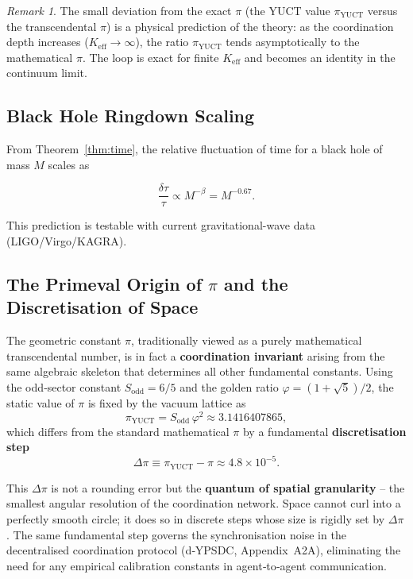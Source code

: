 \documentclass[12pt,a4paper]{article}
\theoremstyle{remark}
\newtheorem{remark}[theorem]{Remark}
\begin{document}
	\begin{remark}
		The small deviation from the exact \(\pi\) (the YUCT value
		\(\pi_{\mathrm{YUCT}}\) versus the transcendental \(\pi\)) is a physical
		prediction of the theory: as the coordination depth increases
		(\(K_{\mathrm{eff}} \to \infty\)), the ratio \(\pi_{\mathrm{YUCT}}\) tends
		asymptotically to the mathematical \(\pi\).  The loop is exact for finite
		\(K_{\mathrm{eff}}\) and becomes an identity in the continuum limit.
	\end{remark}
	
	\subsection{Black Hole Ringdown Scaling}
	
	From Theorem~\ref{thm:time}, the relative fluctuation of time for a black hole
	of mass \(M\) scales as
	
	\begin{equation}
		\boxed{\frac{\delta \tau}{\tau} \propto M^{-\beta} = M^{-0.67}}.
	\end{equation}
	
	This prediction is testable with current gravitational-wave data (LIGO/Virgo/KAGRA).
	
	\subsection{The Primeval Origin of \(\pi\) and the Discretisation of Space}
	
	The geometric constant \(\pi\), traditionally viewed as a purely mathematical
	transcendental number, is in fact a \textbf{coordination invariant} arising from
	the same algebraic skeleton that determines all other fundamental constants.
	Using the odd‑sector constant \(S_{\mathrm{odd}}=6/5\) and the golden ratio
	\(\varphi = (1+\sqrt{5})/2\), the static value of \(\pi\) is fixed by the
	vacuum lattice as
	\[
	\boxed{\pi_{\mathrm{YUCT}} = S_{\mathrm{odd}}\,\varphi^{2}
		\approx 3.1416407865},
	\]
	which differs from the standard mathematical \(\pi\) by a fundamental
	\textbf{discretisation step}
	\[
	\Delta\pi \equiv \pi_{\mathrm{YUCT}} - \pi \approx 4.8 \times 10^{-5}.
	\]
	
	This \(\Delta\pi\) is not a rounding error but the \textbf{quantum of spatial
		granularity} – the smallest angular resolution of the coordination network.
	Space cannot curl into a perfectly smooth circle; it does so in discrete steps
	whose size is rigidly set by \(\Delta\pi\).  The same fundamental step governs
	the synchronisation noise in the decentralised coordination protocol
	(d‑YPSDC, Appendix~A2A), eliminating the need for any empirical calibration
	constants in agent‑to‑agent communication.
	
\end{document}
